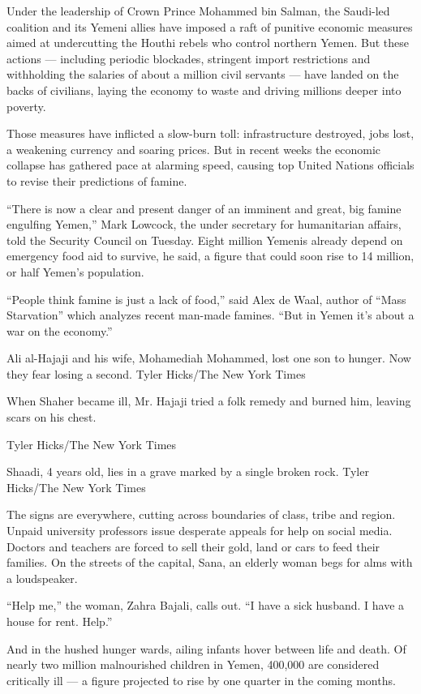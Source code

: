 Under the leadership of Crown Prince Mohammed bin Salman, the Saudi-led
coalition and its Yemeni allies have imposed a raft of punitive economic
measures aimed at undercutting the Houthi rebels who control northern
Yemen. But these actions --- including periodic blockades, stringent
import restrictions and withholding the salaries of about a million
civil servants --- have landed on the backs of civilians, laying the
economy to waste and driving millions deeper into poverty.

Those measures have inflicted a slow-burn toll: infrastructure
destroyed, jobs lost, a weakening currency and soaring prices. But in
recent weeks the economic collapse has gathered pace at alarming speed,
causing top United Nations officials to revise their predictions of
famine.

``There is now a clear and present danger of an imminent and great, big
famine engulfing Yemen,'' Mark Lowcock, the under secretary for
humanitarian affairs, told the Security Council on Tuesday. Eight
million Yemenis already depend on emergency food aid to survive, he
said, a figure that could soon rise to 14 million, or half Yemen's
population.

``People think famine is just a lack of food,'' said Alex de Waal,
author of ``Mass Starvation'' which analyzes recent man-made famines.
``But in Yemen it's about a war on the economy.''

Ali al-Hajaji and his wife, Mohamediah Mohammed, lost one son to hunger.
Now they fear losing a second. Tyler Hicks/The New York Times

When Shaher became ill, Mr. Hajaji tried a folk remedy and burned him,
leaving scars on his chest.

 Tyler Hicks/The New York Times

Shaadi, 4 years old, lies in a grave marked by a single broken rock.
Tyler Hicks/The New York Times

The signs are everywhere, cutting across boundaries of class, tribe and
region. Unpaid university professors issue desperate appeals for help on
social media. Doctors and teachers are forced to sell their gold, land
or cars to feed their families. On the streets of the capital, Sana, an
elderly woman begs for alms with a loudspeaker.

``Help me,'' the woman, Zahra Bajali, calls out. ``I have a sick
husband. I have a house for rent. Help.''

And in the hushed hunger wards, ailing infants hover between life and
death. Of nearly two million malnourished children in Yemen, 400,000 are
considered critically ill --- a figure projected to rise by one quarter
in the coming months.

